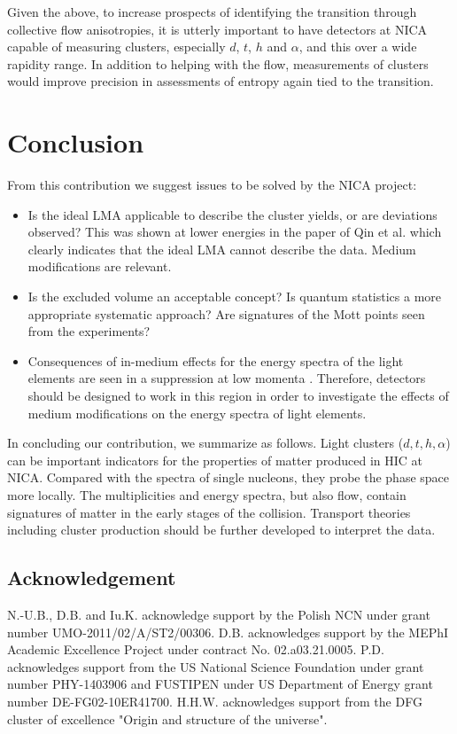 \documentclass[epj]{svjour}
\begin{document}
Given the above, to increase prospects of identifying the transition through
collective flow anisotropies, it is utterly important to have detectors at
NICA capable of measuring clusters, especially $d$, $t$, $h$ and $\alpha$, and
this over a wide rapidity range.
In addition to helping with the flow, measurements of clusters would improve
precision in assessments of entropy \cite{Pal:2003rz} again tied to the 
transition.

\section{Conclusion}
%
From this contribution we suggest issues to be solved by the NICA project:
\begin{itemize}
\item Is the  ideal LMA applicable to describe the cluster yields, or are deviations observed?
This was shown at lower energies in the paper of Qin et al.  \cite{NatowitzEoS} which clearly indicates that  the ideal LMA cannot describe the data. Medium modifications are relevant.
\item Is the excluded volume an acceptable concept? Is quantum statistics a more appropriate systematic approach? Are signatures of the Mott points seen from the experiments?
\item Consequences of in-medium effects for the energy spectra of the light elements are seen in a suppression at low momenta
\cite{Ropke:1985dr}. 
Therefore, detectors should be designed to work in this region in order to investigate the effects of medium modifications on the energy spectra of light elements. 
\end{itemize}
In concluding our contribution, we summarize as follows.
Light clusters ($d, t, h, \alpha$) can be important indicators for the properties of matter produced
in HIC at NICA. Compared with the spectra of single nucleons, they probe the phase space more locally. The multiplicities and energy spectra, but also flow, contain signatures of matter in the early stages 
of the collision.  Transport theories including cluster production should be further developed to interpret the data.


\subsection*{Acknowledgement}
%
N.-U.B., D.B. and Iu.K. acknowledge support by the Polish NCN under grant number 
UMO-2011/02/A/ST2/00306.
D.B. acknowledges support by the MEPhI Academic Excellence Project 
under contract No. 02.a03.21.0005.
P.D. acknowledges support from the US National Science Foundation under grant number PHY-1403906 and FUSTIPEN under US Department of Energy grant number DE-FG02-10ER41700.
H.H.W. acknowledges support  from the DFG cluster of excellence "Origin and structure of the universe".
%
\end{document}
